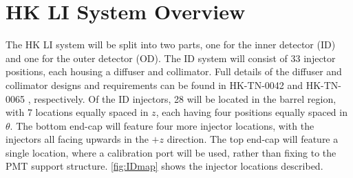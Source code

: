 \documentclass[a4paper,11pt]{article}
\begin{document}
\section{HK LI System Overview}\label{sec:overview}

The HK LI system will be split into two parts, one for the inner detector (ID) and one for the outer detector (OD). The ID system will consist of 33 injector positions, each housing a diffuser and collimator. Full details of the diffuser and collimator designs and requirements can be found in HK-TN-0042 \cite{bib:tn0042} and HK-TN-0065 \cite{bib:tn0065}, respectively. Of the ID injectors, 28 will be located in the barrel region, with 7 locations equally spaced in $z$, each having four positions equally spaced in $\theta$. The bottom end-cap will feature four more injector locations, with the injectors all facing upwards in the $+z$ direction. The top end-cap will feature a single location, where a calibration port will be used, rather than fixing to the PMT support structure. \cref{fig:IDmap} shows the injector locations described.
\end{document}
